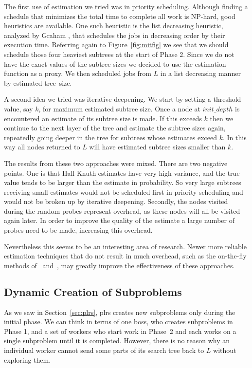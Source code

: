 \documentclass[a4paper,11pt]{article}   \usepackage{authblk} \usepackage[top=1.9cm,bottom=1.9cm,left=1.9cm,right=1.9cm]{geometry}
\newcommand{\progname}{\textsf}
\newcommand{\plrs}{\progname{plrs}\xspace}
\newcommand{\initdepth}{\ensuremath{\mathit{init\_depth}}\xspace}
\begin{document}
The first use of estimation we tried was in priority scheduling.
Although finding a schedule that minimizes the total time to complete all work is NP-hard,
good heuristics are available.
One such heuristic is the list decreasing heuristic, analyzed by  Graham \cite{Gr69},
that schedules the jobs in decreasing order by their execution time.
Referring again to 
Figure~\ref{fig:mitfig}
we see that we should schedule those four heaviest subtrees at the start of
Phase 2. Since we do not have the exact values of the subtree sizes we
decided to use the estimation function as a proxy. We then scheduled jobs
from $L$ in a list decreasing manner by estimated tree~size.

A second idea we tried was iterative deepening.
We start by 
setting a threshold value, say $k$, for maximum estimated subtree size.  
Once a node at \initdepth is encountered an estimate of its subtree
size is made. If this exceeds $k$ then we continue to the next layer
of the tree and estimate the subtree sizes again, repeatedly going deeper
in the tree for subtrees whose estimates
exceed $k$. In this way all nodes returned to $L$ will have estimated
subtree sizes smaller than $k$.

The results from these two approaches were mixed. There are two negative
points. One is that Hall-Knuth estimates have very high variance, and
the true value tends to be larger than the estimate in probability.
So very large subtrees receiving small estimates would not be scheduled
first in priority scheduling and would not
be broken up by iterative deepening.
Secondly, the nodes visited during the random probes
represent overhead, as these nodes will all be visited again later.
In order to improve the quality of the estimate a large number of probes
need to be made, increasing this overhead.

Nevertheless this seems to be an interesting area of research. Newer
more reliable estimation techniques that
do not result in much overhead, such as the on-the-fly methods of~\cite{CKL}
and~\cite{KSW}, may greatly improve the effectiveness of these approaches.

\subsection{Dynamic Creation of Subproblems}
\label{subsec:dynamic}

As we saw in Section~\ref{sec:plrs}, \plrs creates new subproblems only
during the initial phase.  We can think in terms of one boss, 
who creates subproblems in Phase 1, and a set of workers who 
start work in Phase~2 and 
each works on a single subproblem until it is completed.
However, there is no reason why an individual worker cannot
send some parts of its search tree back to $L$ without exploring them.
\end{document}
